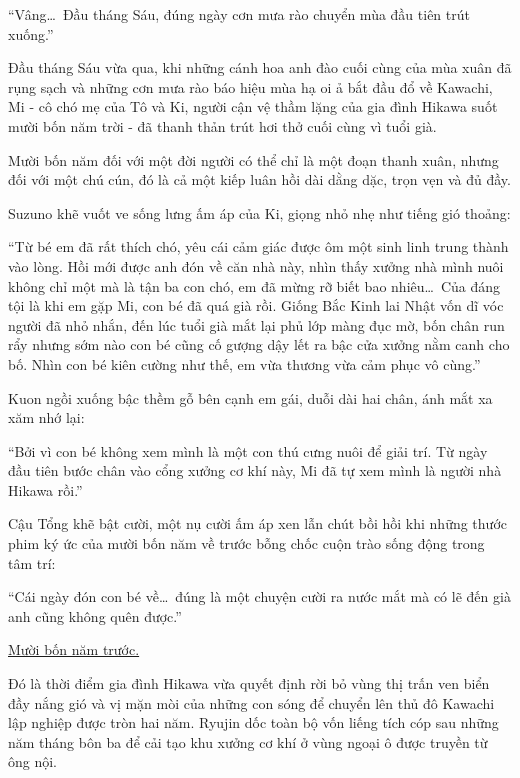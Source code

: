 \documentclass[../main.tex]{subfiles}
\begin{document}
``Vâng\dots\ Đầu tháng Sáu, đúng ngày cơn mưa rào chuyển mùa đầu tiên trút xuống.''

Đầu tháng Sáu vừa qua, khi những cánh hoa anh đào cuối cùng của mùa xuân đã rụng sạch và những cơn mưa rào báo hiệu mùa hạ oi ả bắt đầu đổ về Kawachi, Mi - cô chó mẹ của Tô và Ki, người cận vệ thầm lặng của gia đình Hikawa suốt mười bốn năm trời - đã thanh thản trút hơi thở cuối cùng vì tuổi già.

Mười bốn năm đối với một đời người có thể chỉ là một đoạn thanh xuân, nhưng đối với một chú cún, đó là cả một kiếp luân hồi dài dằng dặc, trọn vẹn và đủ đầy.

Suzuno khẽ vuốt ve sống lưng ấm áp của Ki, giọng nhỏ nhẹ như tiếng gió thoảng:

``Từ bé em đã rất thích chó, yêu cái cảm giác được ôm một sinh linh trung thành vào lòng. Hồi mới được anh đón về căn nhà này, nhìn thấy xưởng nhà mình nuôi không chỉ một mà là tận ba con chó, em đã mừng rỡ biết bao nhiêu\dots\ Của đáng tội là khi em gặp Mi, con bé đã quá già rồi. Giống Bắc Kinh lai Nhật vốn dĩ vóc người đã nhỏ nhắn, đến lúc tuổi già mắt lại phủ lớp màng đục mờ, bốn chân run rẩy nhưng sớm nào con bé cũng cố gượng dậy lết ra bậc cửa xưởng nằm canh cho bố. Nhìn con bé kiên cường như thế, em vừa thương vừa cảm phục vô cùng.''

Kuon ngồi xuống bậc thềm gỗ bên cạnh em gái, duỗi dài hai chân, ánh mắt xa xăm nhớ lại:

``Bởi vì con bé không xem mình là một con thú cưng nuôi để giải trí. Từ ngày đầu tiên bước chân vào cổng xưởng cơ khí này, Mi đã tự xem mình là người nhà Hikawa rồi.''

Cậu Tổng khẽ bật cười, một nụ cười ấm áp xen lẫn chút bồi hồi khi những thước phim ký ức của mười bốn năm về trước bỗng chốc cuộn trào sống động trong tâm trí:

``Cái ngày đón con bé về\dots\ đúng là một chuyện cười ra nước mắt mà có lẽ đến già anh cũng không quên được.''

\ct

\begin{center}
    \uline{Mười bốn năm trước.}
\end{center}

Đó là thời điểm gia đình Hikawa vừa quyết định rời bỏ vùng thị trấn ven biển đầy nắng gió và vị mặn mòi của những con sóng để chuyển lên thủ đô Kawachi lập nghiệp được tròn hai năm. Ryujin dốc toàn bộ vốn liếng tích cóp sau những năm tháng bôn ba để cải tạo khu xưởng cơ khí ở vùng ngoại ô được truyền từ ông nội.
\end{document}
